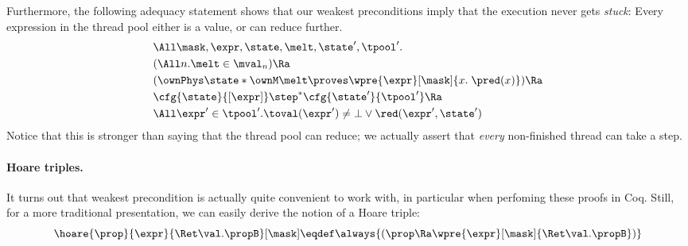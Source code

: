 Furthermore, the following adequacy statement shows that our weakest preconditions imply that the execution never gets \emph{stuck}: Every expression in the thread pool either is a value, or can reduce further.
\begin{align*}
 &\All \mask, \expr, \state, \melt, \state', \tpool'.
 \\&(\All n. \melt \in \mval_n) \Ra
 \\&( \ownPhys\state * \ownM\melt \proves \wpre{\expr}[\mask]{x.\; \pred(x)}) \Ra
 \\&\cfg{\state}{[\expr]} \step^\ast
     \cfg{\state'}{\tpool'} \Ra
     \\&\All\expr'\in\tpool'. \toval(\expr') \neq \bot \lor \red(\expr', \state')
\end{align*}
Notice that this is stronger than saying that the thread pool can reduce; we actually assert that \emph{every} non-finished thread can take a step.

\paragraph{Hoare triples.}
It turns out that weakest precondition is actually quite convenient to work with, in particular when perfoming these proofs in Coq.
Still, for a more traditional presentation, we can easily derive the notion of a Hoare triple:
\[
\hoare{\prop}{\expr}{\Ret\val.\propB}[\mask] \eqdef \always{(\prop \Ra \wpre{\expr}[\mask]{\Ret\val.\propB})}
\]

